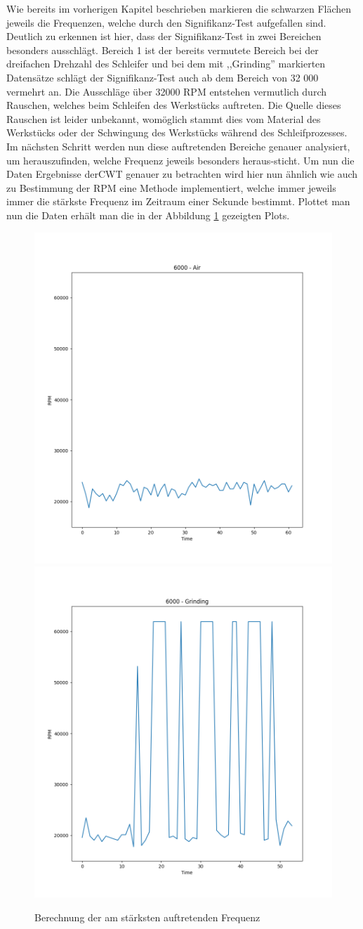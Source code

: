 Wie bereits im vorherigen Kapitel beschrieben markieren die schwarzen Flächen jeweils die Frequenzen, welche durch den Signifikanz-Test aufgefallen sind. Deutlich zu erkennen ist hier, dass der Signifikanz-Test in zwei Bereichen besonders ausschlägt. Bereich 1 ist der bereits vermutete Bereich bei der dreifachen Drehzahl des Schleifer und bei dem mit ,,Grinding'' markierten Datensätze schlägt der Signifikanz-Test auch ab dem Bereich von 32 000 vermehrt an.  Die Ausschläge über 32000 RPM entstehen vermutlich durch Rauschen, welches beim Schleifen des Werkstücks auftreten. Die Quelle dieses Rauschen ist leider unbekannt, womöglich stammt dies vom Material des Werkstücks oder der Schwingung des Werkstücks während des Schleifprozesses. Im nächsten Schritt werden nun diese auftretenden Bereiche genauer analysiert, um herauszufinden, welche Frequenz jeweils besonders heraus-sticht. Um nun die Daten Ergebnisse der\ac{CWT} genauer zu betrachten wird hier nun ähnlich wie auch zu Bestimmung der RPM eine Methode implementiert, welche immer jeweils immer die stärkste Frequenz im Zeitraum einer Sekunde bestimmt. Plottet man nun die Daten erhält man die in der Abbildung \ref{fig:cwt-iso-freqs} gezeigten Plots. 

\begin{figure}[H]
    \includegraphics[width=0.5\linewidth]{Studienarbeit//images/cwt-6000-air-freqs-1.png}    
    \includegraphics[width=0.5\linewidth]{Studienarbeit//images/cwt-6000-grinding-freqs-1.png}    
    \caption{Berechnung der am stärksten auftretenden Frequenz}
    \label{fig:cwt-iso-freqs}
\end{figure}

